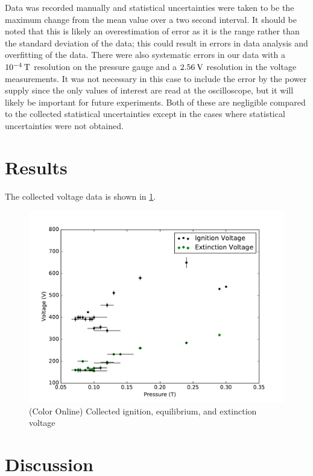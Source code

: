 \documentclass[reprint]{revtex4-1}
\begin{document}
Data was recorded manually and statistical uncertainties were taken to be the maximum change from the mean value over a two second interval. It should be noted that this is likely an overestimation of error as it is the range rather than the standard deviation of the data; this could result in errors in data analysis and overfitting of the data. There were also systematic errors in our data with a $10^{-4}\:\rm{T}$ resolution on the pressure gauge and a $2.56\:\rm{V}$ resolution in the voltage measurements. It was not necessary in this case to include the error by the power supply since the only values of interest are read at the oscilloscope, but it will likely be important for future experiments. Both of these are negligible compared to the collected statistical uncertainties except in the cases where statistical uncertainties were not obtained.

\section{Results}

The collected voltage data is shown in \cref{fig:ignition-equilibrium-extinction}.

\begin{figure}[h]
\includegraphics[width=\columnwidth]{../resources/ignition-equilibrium-extinction.pdf}
\caption{(Color Online) Collected ignition, equilibrium, and extinction voltage}
\label{fig:ignition-equilibrium-extinction}
\end{figure}

\section{Discussion}
\end{document}
